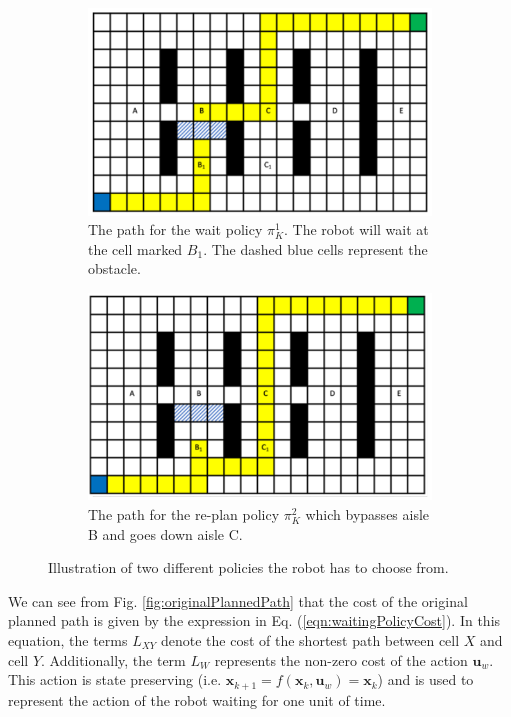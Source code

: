 \documentclass[a4paper,12pt]{article}
\begin{document}
			\begin{figure}[H]
				\centering
				\begin{subfigure}{.4\textwidth}
					\centering
					\includegraphics[width=\linewidth]{blockedAisleB.png}
					\caption{The path for the wait policy $\pi_{K}^{1}$. The robot will wait at the cell marked $B_1$. The dashed blue cells represent the obstacle.}
					\label{fig:waitPathAisleB}
				\end{subfigure}
				\begin{subfigure}{.4\textwidth}
					\centering
					\includegraphics[width=\linewidth]{replannedPathAisleB.png}
					\caption{The path for the re-plan policy $\pi_{K}^{2}$ which bypasses aisle B and goes down aisle C.}
					\label{fig:replannedPathAisleB}
				\end{subfigure}
				\caption{Illustration of two different policies the robot has to choose from.}
				\label{fig:policiesMaps}
			\end{figure}

			We can see from Fig. \ref{fig:originalPlannedPath} that the cost of the original planned path is given by the expression in Eq. (\ref{eqn:waitingPolicyCost}). In this equation, the terms $L_{XY}$ denote the cost of the shortest path between cell $X$ and cell $Y$. Additionally, the term $L_{W}$ represents the non-zero cost of the action $\boldsymbol{u}_w$. This action is state preserving (i.e. $\boldsymbol{x}_{k+1} = f(\boldsymbol{x}_k,\boldsymbol{u}_w) = \boldsymbol{x}_k$) and is used to represent the action of the robot waiting for one unit of time. 
			
\end{document}
